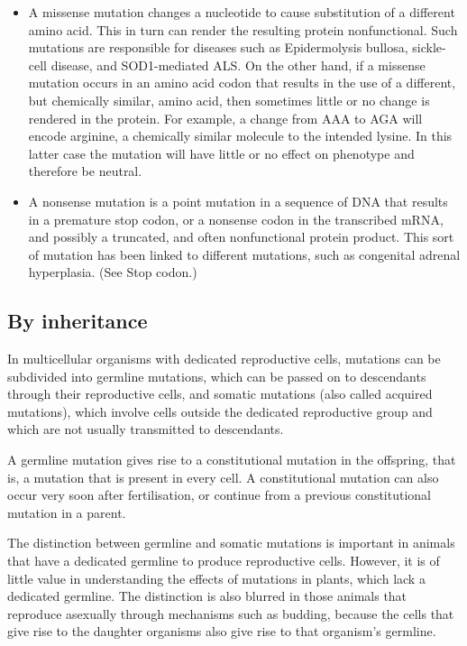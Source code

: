 \begin{itemize}
\begin{itemize}
    \begin{itemize}
    \tightlist
    \item
      A missense mutation changes a nucleotide to cause substitution of a different amino acid. This in turn can render the resulting protein nonfunctional. Such mutations are responsible for diseases such as Epidermolysis bullosa, sickle-cell disease, and SOD1-mediated ALS. On the other hand, if a missense mutation occurs in an amino acid codon that results in the use of a different, but chemically similar, amino acid, then sometimes little or no change is rendered in the protein. For example, a change from AAA to AGA will encode arginine, a chemically similar molecule to the intended lysine. In this latter case the mutation will have little or no effect on phenotype and therefore be neutral.
    \item
      A nonsense mutation is a point mutation in a sequence of DNA that results in a premature stop codon, or a nonsense codon in the transcribed mRNA, and possibly a truncated, and often nonfunctional protein product. This sort of mutation has been linked to different mutations, such as congenital adrenal hyperplasia. (See Stop codon.)
    \end{itemize}
  \end{itemize}
\end{itemize}

\hypertarget{by-inheritance}{%
\subsection{By inheritance}\label{by-inheritance}}

In multicellular organisms with dedicated reproductive cells, mutations can be subdivided into germline mutations, which can be passed on to descendants through their reproductive cells, and somatic mutations (also called acquired mutations), which involve cells outside the dedicated reproductive group and which are not usually transmitted to descendants.

A germline mutation gives rise to a constitutional mutation in the offspring, that is, a mutation that is present in every cell. A constitutional mutation can also occur very soon after fertilisation, or continue from a previous constitutional mutation in a parent.

The distinction between germline and somatic mutations is important in animals that have a dedicated germline to produce reproductive cells. However, it is of little value in understanding the effects of mutations in plants, which lack a dedicated germline. The distinction is also blurred in those animals that reproduce asexually through mechanisms such as budding, because the cells that give rise to the daughter organisms also give rise to that organism's germline.

